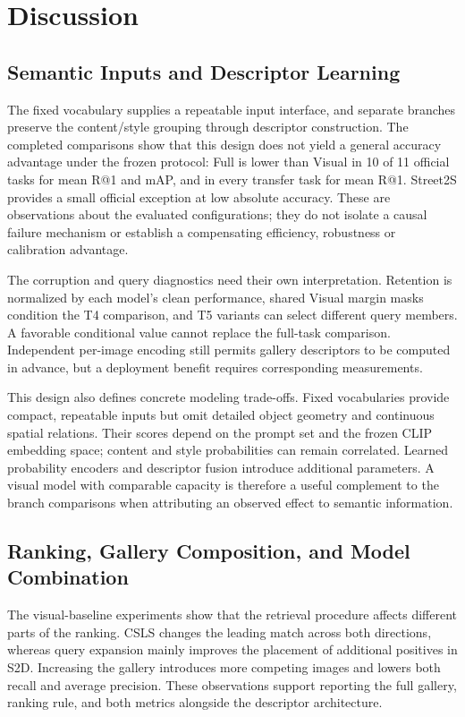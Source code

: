 \documentclass[journal]{IEEEtran}
\begin{document}
\section{Discussion}

\subsection{Semantic Inputs and Descriptor Learning}

The fixed vocabulary supplies a repeatable input interface, and separate
branches preserve the content/style grouping through descriptor construction.
The completed comparisons show that this design does not yield a general
accuracy advantage under the frozen protocol: Full is lower than Visual in
10 of 11 official tasks for mean R@1 and mAP, and in every transfer task for
mean R@1. Street2S provides a small official exception at low absolute
accuracy. These are observations about the evaluated configurations; they
do not isolate a causal failure mechanism or establish a compensating
efficiency, robustness or calibration advantage.

The corruption and query diagnostics need their own interpretation.
Retention is normalized by each model's clean performance, shared Visual
margin masks condition the T4 comparison, and T5 variants can select
different query members. A favorable conditional value cannot replace the
full-task comparison. Independent per-image encoding still permits gallery
descriptors to be computed in advance, but a deployment benefit requires
corresponding measurements.

This design also defines concrete modeling trade-offs. Fixed vocabularies
provide compact, repeatable inputs but omit detailed object geometry and
continuous spatial relations. Their scores depend on the prompt set and the
frozen CLIP embedding space; content and style probabilities can remain
correlated. Learned probability encoders and descriptor fusion introduce
additional parameters. A visual model with comparable capacity is therefore
a useful complement to the branch comparisons when attributing an observed
effect to semantic information.

\subsection{Ranking, Gallery Composition, and Model Combination}

The visual-baseline experiments show that the retrieval procedure affects
different parts of the ranking. CSLS changes the leading match across both
directions, whereas query expansion mainly improves the placement of
additional positives in S2D. Increasing the gallery introduces more
competing images and lowers both recall and average precision. These
observations support reporting the full gallery, ranking rule, and both
metrics alongside the descriptor architecture.
\end{document}
